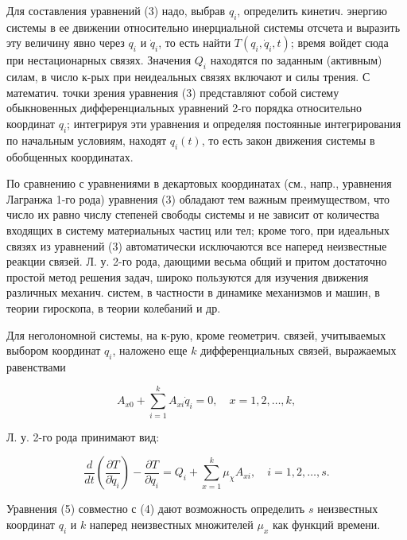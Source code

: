 \documentclass[10pt]{article}
\begin{document}
Для составления уравнений (3) надо, выбрав $q_{i}$, определить кинетич. энергию системы в ее движении относительно инерциальной системы отсчета и выразить эту величину явно через $q_{i}$ и $\dot{q}_{i}$, то есть найти $T\left(q_{i}, \dot{q}_{i}, t\right)$; время войдет сюда при нестационарных связях. Значения $Q_{i}$ находятся по заданным (активным) силам, в число к-рых при неидеальных связях включают и силы трения. С математич. точки зрения уравнения (3) представляют собой систему обыкновенных дифференциальных уравнений 2-го порядка относительно координат $q_{i}$; интегрируя эти уравнения и определяя постоянные интегрирования по начальным условиям, находят $q_{i}(t)$, то есть закон движения системы в обобщенных координатах.



По сравнению с уравнениями в декартовых координатах (см., напр., уравнения Лагранжа 1-го рода) уравнения (3) обладают тем важным преимуществом, что число их равно числу степеней свободы системы и не зависит от количества входящих в систему материальных частиц или тел; кроме того, при идеальных связях из уравнений (3) автоматически исключаются все наперед неизвестные реакции связей. Л. у. 2-го рода, дающими весьма общий и притом достаточно простой метод решения задач, широко пользуются для изучения движения различных механич. систем, в частности в динамике механизмов и машин, в теории гироскопа, в теории колебаний и др.



Для неголономной системы, на к-рую, кроме геометрич. связей, учитываемых выбором координат $q_{i}$, наложено еще $k$ дифференциальных связей, выражаемых равенствами



\[

A_{x 0}+\sum_{i=1}^{k} A_{x i} \dot{q}_{i}=0, \quad x=1,2, \ldots, k,

\]



Л. у. 2-го рода принимают вид:



\[

\frac{d}{d t}\left(\frac{\partial T}{\partial \dot{q}_{i}}\right)-\frac{\partial T}{\partial q_{i}}=Q_{i}+\sum_{x=1}^{k} \mu_{\chi} A_{x i}, \quad i=1,2, \ldots, s .

\]



Уравнения (5) совместно с (4) дают возможность определить $s$ неизвестных координат $q_{i}$ и $k$ наперед неизвестных множителей $\mu_{x}$ как функций времени.
\end{document}
